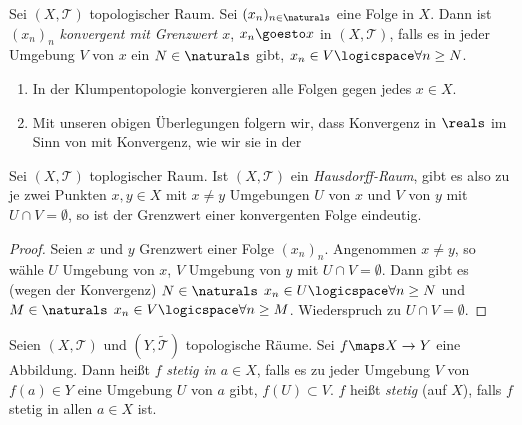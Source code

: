 \begin{definition} \label{konvergenz_in_topologischen_raeumen}
    Sei \( (X, \mathcal{T}) \) topologischer Raum.
    Sei \( (x_n)_{n\in \naturals} \) eine Folge in \( X \).
    Dann ist \( (x_n)_{n} \) \emph{konvergent mit Grenzwert \( x \)}, \( x_n\goesto x \) in \( (X, \mathcal{T}) \), falls es in jeder Umgebung \( V \) von \( x  \) ein \( N\in \naturals \) gibt, \sd \( x_n\in V\logicspace\forall n\geq N \).
    
\end{definition}

\begin{beispiele*}
    \begin{enumerate}
        \item In der Klumpentopologie konvergieren alle Folgen gegen jedes \( x\in X \).
        \item Mit unseren obigen Überlegungen folgern wir, dass Konvergenz in \( \reals \) im Sinn von  mit Konvergenz, wie wir sie in der 
    \end{enumerate}
\end{beispiele*}
\begin{lemma}\label{hausdorff_alle_grenzwerte_eindeutig}
    Sei \( (X,\mathcal{T}) \) toplogischer Raum. 
    Ist \( (X, \mathcal{T}) \) ein \emph{Hausdorff-Raum}, gibt es also zu je zwei Punkten \( x,y\in X \) mit \( x\neq y \) Umgebungen \( U \) von \( x \) und \( V \) von \( y \) mit \( U \cap V=\emptyset \), so ist der Grenzwert einer konvergenten Folge eindeutig.
\end{lemma}
\begin{proof}
    Seien \( x \) und \( y \) Grenzwert einer Folge \( (x_n)_n \).
    Angenommen \( x\neq y \), so wähle \( U \) Umgebung von \( x \), \( V \) Umgebung von \( y \) mit \( U\cap V=\emptyset \). 
    Dann gibt es (wegen der Konvergenz) \( N \in \naturals \) \sd \( x_n \in U \logicspace\forall n \geq N \) und \( M\in \naturals \) \sd \( x_n \in V \logicspace \forall n \geq M \). 
    Wiederspruch zu \( U\cap V = \emptyset \). 
\end{proof}
\begin{definition}\label{stetigkeit_in_topologischen_raeumen}
    Seien \( (X, \mathcal{T}) \) und \( (Y,\tilde{\mathcal{T}}) \) topologische Räume. 
    Sei \( f\maps X\to Y \) eine Abbildung. 
    Dann heißt \( f \) \emph{stetig in \( a\in X \)}, falls es zu jeder Umgebung \( V \) von \( f(a)\in Y \) eine Umgebung \( U \) von \( a \) gibt, \sd \( f(U)\subset V \). 
    \( f \) heißt \emph{stetig} (auf \( X \)), falls \( f \) stetig in allen \( a\in X \) ist.
\end{definition}
